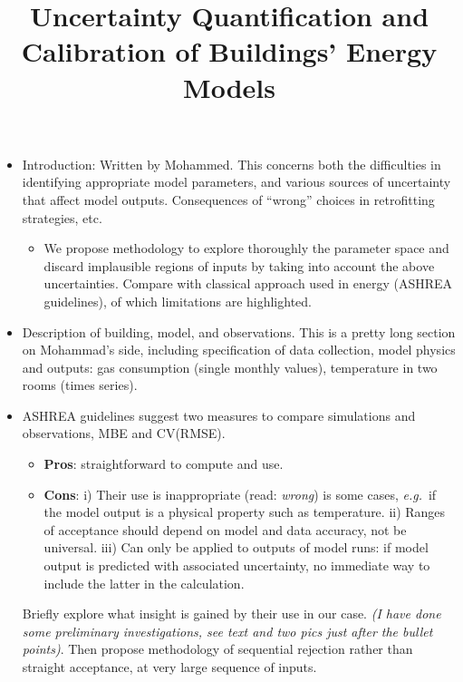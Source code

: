 \documentclass[a4paper, 12pt]{article}
\title{Uncertainty Quantification and Calibration of Buildings' Energy Models}
\author{}
\date{}
\begin{document}
\maketitle

\vspace{-5ex}



\begin{itemize}[leftmargin=*]
\setlength{\itemsep}{1ex}
\item Introduction: Written by Mohammed. This concerns both the difficulties in identifying appropriate model parameters, and various sources of uncertainty that affect model outputs. Consequences of ``wrong'' choices in retrofitting strategies, etc.
\begin{itemize}
\item We propose methodology to explore thoroughly the parameter space and discard implausible regions of inputs by taking into account the above uncertainties. Compare with classical 
approach used in energy (ASHREA guidelines), of which limitations are highlighted.
\end{itemize}
\item Description of building, model, and observations. This is a pretty long section on Mohammad's side, including specification of data collection, model physics and outputs: gas consumption (single monthly values), temperature in two rooms (times series). 

\item ASHREA guidelines suggest two measures to compare simulations and observations, MBE and CV(RMSE). 
\begin{itemize}
\item {\bf Pros}: straightforward to compute and use. 
\item {\bf Cons}: i) Their use is inappropriate (read: \emph{wrong}) is some cases, \textit{e.g.}~if the model output is a physical property such as temperature.
ii) Ranges of acceptance should depend on model and data accuracy, not be universal. iii) Can only be applied to outputs of model runs: if model output is predicted with associated uncertainty, no immediate way to include the latter in the calculation.
\end{itemize}
Briefly explore what insight is gained by their use in our case. \emph{(I have done some preliminary investigations, see text and two pics just after the bullet points)}. Then propose methodology of sequential rejection rather than  straight acceptance, at very large sequence of inputs.


\end{itemize}
\end{document}
